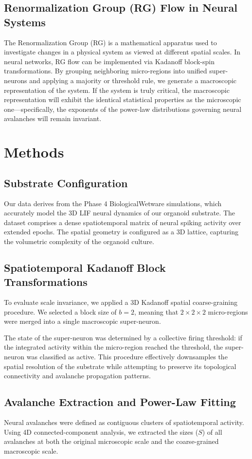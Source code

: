 \documentclass[11pt,a4paper]{article}
\begin{document}
\subsection{Renormalization Group (RG) Flow in Neural Systems}
The Renormalization Group (RG) is a mathematical apparatus used to investigate changes in a physical system as viewed at different spatial scales. In neural networks, RG flow can be implemented via Kadanoff block-spin transformations. By grouping neighboring micro-regions into unified super-neurons and applying a majority or threshold rule, we generate a macroscopic representation of the system. If the system is truly critical, the macroscopic representation will exhibit the identical statistical properties as the microscopic one---specifically, the exponents of the power-law distributions governing neural avalanches will remain invariant.

\section{Methods}
\subsection{Substrate Configuration}
Our data derives from the Phase 4 BiologicalWetware simulations, which accurately model the 3D LIF neural dynamics of our organoid substrate. The dataset comprises a dense spatiotemporal matrix of neural spiking activity over extended epochs. The spatial geometry is configured as a 3D lattice, capturing the volumetric complexity of the organoid culture.

\subsection{Spatiotemporal Kadanoff Block Transformations}
To evaluate scale invariance, we applied a 3D Kadanoff spatial coarse-graining procedure. We selected a block size of $b=2$, meaning that $2 \times 2 \times 2$ micro-regions were merged into a single macroscopic super-neuron. 

The state of the super-neuron was determined by a collective firing threshold: if the integrated activity within the micro-region reached the threshold, the super-neuron was classified as active. This procedure effectively downsamples the spatial resolution of the substrate while attempting to preserve its topological connectivity and avalanche propagation patterns.

\subsection{Avalanche Extraction and Power-Law Fitting}
Neural avalanches were defined as contiguous clusters of spatiotemporal activity. Using 4D connected-component analysis, we extracted the sizes ($S$) of all avalanches at both the original microscopic scale and the coarse-grained macroscopic scale. 
\end{document}
